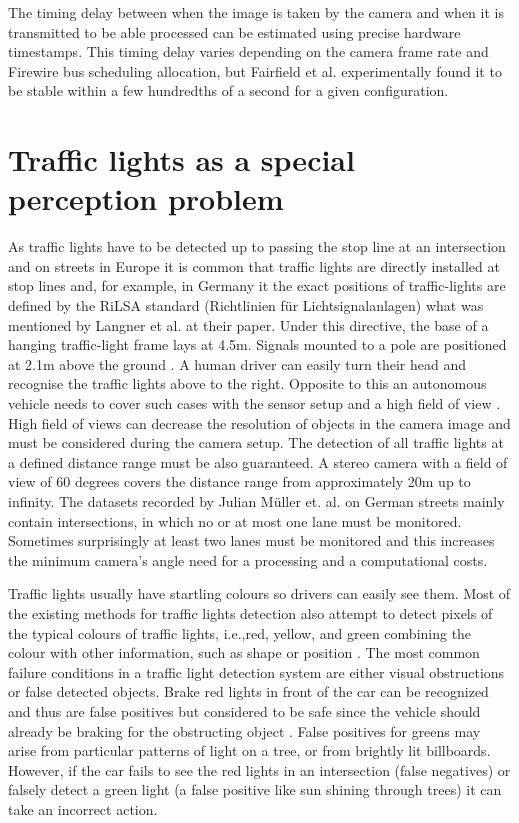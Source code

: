 \documentclass[letterpaper, 10 pt, conference]{ieeeconf} %
\begin{document}
The timing delay between when the image is taken by the camera and when it is transmitted to be able processed can be estimated using precise hardware timestamps. This timing delay varies depending on the camera frame rate and Firewire bus scheduling allocation, but Fairfield et al. experimentally found it to be stable within a few hundredths of a second for a given configuration.
 
\section{Traffic lights as a special perception problem}

As traffic lights have to be detected up to passing the stop line at an intersection and on streets in Europe it is common that traffic lights are directly installed at stop lines \cite{c2} and, for example, in Germany it the exact positions of traffic-lights are defined by the RiLSA standard (Richtlinien f\"ur Lichtsignalanlagen) \cite{c4} what was mentioned by Langner et al. at their paper. Under this directive, the base of a hanging traffic-light frame lays at 4.5m. Signals mounted to a pole are positioned at 2.1m above the ground \cite{c4}. A human driver can easily turn their head and recognise the traffic lights above to the right. Opposite to this an autonomous vehicle needs to cover such cases with the sensor setup and a high field of view \cite{c2}. High field of views can decrease the resolution of objects in the camera image and must be considered during the camera setup. The detection of all traffic lights at a defined distance range must be also guaranteed. A stereo camera with a field of view of 60 degrees covers the distance range from approximately 20m up to infinity. The datasets recorded by Julian M\"uller et. al. \cite{c1} \cite{c2} on German streets mainly contain intersections, in which no or at most one lane must be monitored. Sometimes surprisingly at least two lanes must be monitored and this increases the minimum camera's angle need for a processing and a computational costs.

Traffic lights usually have startling colours so drivers can easily see them. Most of the existing methods for traffic lights detection also attempt to detect pixels of the typical colours of traffic lights, i.e.,red, yellow, and green combining the colour with other information, such as shape or position \cite{c3}. The most common failure conditions in a traffic light detection system are either visual obstructions or false detected objects. Brake red lights in front of the car can be recognized and thus are false positives but considered to be safe since the vehicle should already be braking for the obstructing object \cite{c5}. False positives for greens may arise from particular patterns of light on a tree, or from brightly lit billboards\cite{c5}. However, if the car fails to see the red lights in an intersection (false negatives) or falsely detect a green light (a false positive like sun shining through trees) it can take an incorrect action. 
\end{document}
